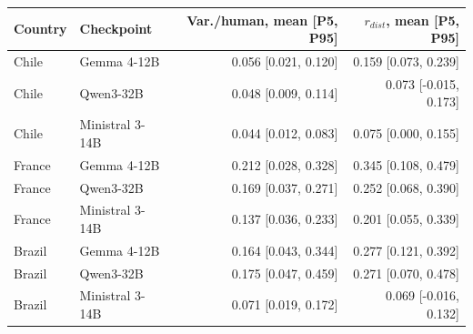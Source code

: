 \begin{tabular}{llrr}
\toprule
Country & Checkpoint & Var./human, mean [P5, P95] & $r_{dist}$, mean [P5, P95] \\
\midrule
Chile & Gemma 4-12B & 0.056 [0.021, 0.120] & 0.159 [0.073, 0.239] \\
Chile & Qwen3-32B & 0.048 [0.009, 0.114] & 0.073 [-0.015, 0.173] \\
Chile & Ministral 3-14B & 0.044 [0.012, 0.083] & 0.075 [0.000, 0.155] \\
France & Gemma 4-12B & 0.212 [0.028, 0.328] & 0.345 [0.108, 0.479] \\
France & Qwen3-32B & 0.169 [0.037, 0.271] & 0.252 [0.068, 0.390] \\
France & Ministral 3-14B & 0.137 [0.036, 0.233] & 0.201 [0.055, 0.339] \\
Brazil & Gemma 4-12B & 0.164 [0.043, 0.344] & 0.277 [0.121, 0.392] \\
Brazil & Qwen3-32B & 0.175 [0.047, 0.459] & 0.271 [0.070, 0.478] \\
Brazil & Ministral 3-14B & 0.071 [0.019, 0.172] & 0.069 [-0.016, 0.132] \\
\bottomrule
\end{tabular}
